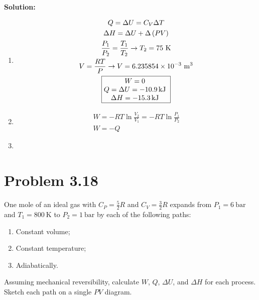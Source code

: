 \documentclass{article}
\newcommand*\widefbox[1]{\fbox{\vspace{0.5em}\hspace{2em}#1\hspace{2em}\vspace{0.5em}}}
\newenvironment{solution}{\par\noindent\textbf{\\Solution:\\}}{\par\medskip}
\begin{document}
\begin{solution}
  \begin{enumerate}[label=(\alph*)]
    \item
      \begin{gather*}
        Q=\Delta U=C_{V}\Delta T\\
        \Delta H=\Delta U+\Delta \left( PV \right)\\
        \frac{P_{1}}{P_{2}}=\frac{T_{1}}{T_{2}}  \to  T_{2}=75~\unit{
        \kelvin }\\
        V = \frac{RT}{P}  \to  V = 6.235854\times10^{-3}~\unit{ \meter\cubed }\\
        \fbox{%
          \parbox{\widthof{$Q = \Delta U = \SI{-10.9}{\kilo\joule}$}}{%
            \centering
            $W = 0$ \\
            $Q = \Delta U = \SI{-10.9}{\kilo\joule}$ \\
            $\Delta H = \SI{-15.3}{\kilo\joule}$
          }
        }
      \end{gather*}
    \item
      \begin{gather*}
        W=-RT\ln\frac{V_{2}}{V_{1}}=-RT\ln\frac{P_{1}}{P_{2}} \\
        W=-Q
      \end{gather*}
    \item
  \end{enumerate}
\end{solution}

\section*{Problem 3.18}
One mole of an ideal gas with $C_P = \frac{5}{2}R$ and $C_V =
\frac{3}{2}R$ expands from $P_1 = \SI{6}{\bar}$ and $T_1 =
\SI{800}{\kelvin}$ to $P_2 = \SI{1}{\bar}$ by each of the following paths:
\begin{enumerate}[label=(\alph*)]
  \item Constant volume;
  \item Constant temperature;
  \item Adiabatically.
\end{enumerate}
Assuming mechanical reversibility, calculate $W$, $Q$, $\Delta U$,
and $\Delta H$ for each process. Sketch each path on a single $PV$ diagram.
\end{document}
